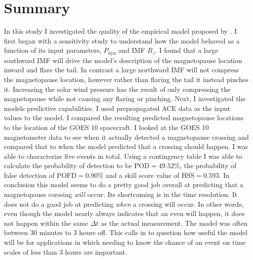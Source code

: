 \documentclass[12pt, letterpaper]{article}
\begin{document}
\section{Summary}
\label{sec:6}
In this study I investigated the quality of the empirical model proposed by \citep{Shue98}. I first began with a sensitivity study to understand how the model behaved as a function of its input parameters, $P_{\text{dyn}}$ and IMF $B_{z}$. I found that a large southward IMF will drive the model's description of the magnetopause location inward and flare the tail. In contrast a large northward IMF will not compress the magnetopause location, however rather than flaring the tail it instead pinches it. Increasing the solar wind pressure has the result of only compressing the magnetopause while not causing any flaring or pinching. Next, I investigated the models predictive capabilities. I used prepropagated ACE data as the input values to the model. I compared the resulting predicted magnetopause locations to the location of the GOES 10 spacecraft. I looked at the GOES 10 magnetometer data to see when it actually detected a magnetopause crossing and compared that to when the model predicted that a crossing should happen. I was able to characterize five events in total. Using a contingency table I was able to calculate the probability of detection to be $\text{POD} = 49.52\%$, the probability of false detection of $\text{POFD} = 0.90\%$ and a skill score value of $\text{HSS} = 0.593$. In conclusion this model seems to do a pretty good job overall at predicting that a magnetopause corssing \emph{will} occur. Its shortcoming is in the time resolution. It does not do a good job at predicting \emph{when} a crossing will occur. In other words, even though the model nearly always indicates that an even will happen, it does not happen within the same $\Delta t$ as the actual measurement. The model was often between 30 minutes to 3 hours off. This calls in to question how useful the model will be for applications in which needing to know the chance of an event on time scales of less than 3 hours are important.

\appendix
\newpage
\end{document}
